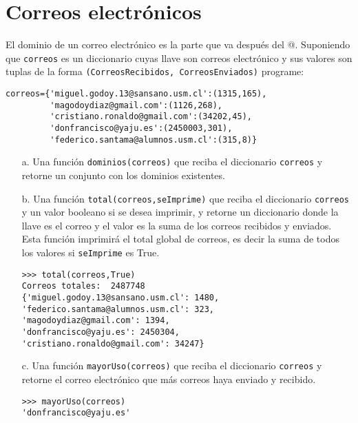 \section{Correos electrónicos}

El dominio de un correo electrónico es la parte que va después del @. Suponiendo que \texttt{correos} es un diccionario cuyas llave son correos electrónico y sus valores son tuplas de la forma \texttt{(CorreosRecibidos, CorreosEnviados)} programe:

\begin{lstlisting}[style=consola]
correos={'miguel.godoy.13@sansano.usm.cl':(1315,165),
         'magodoydiaz@gmail.com':(1126,268),
         'cristiano.ronaldo@gmail.com':(34202,45),
         'donfrancisco@yaju.es':(2450003,301),
         'federico.santama@alumnos.usm.cl':(315,8)}
\end{lstlisting}

\begin{itemize}
    \item[a.] Una función \texttt{dominios(correos)} que reciba el diccionario \texttt{correos} y retorne un conjunto con los dominios existentes.
    
    \item[b.] Una función \texttt{total(correos,seImprime)} que reciba el diccionario \texttt{correos} y un valor booleano si se desea imprimir, y retorne un diccionario donde la llave es el correo y el valor es la suma de los correos recibidos y enviados. Esta función imprimirá el total global de correos, es decir la suma de todos los valores si \texttt{seImprime} es True.
    \begin{lstlisting}[style=consola]
>>> total(correos,True)
Correos totales:  2487748
{'miguel.godoy.13@sansano.usm.cl': 1480,
'federico.santama@alumnos.usm.cl': 323,
'magodoydiaz@gmail.com': 1394,
'donfrancisco@yaju.es': 2450304,
'cristiano.ronaldo@gmail.com': 34247}
    \end{lstlisting}
    
    \item[c.] Una función \texttt{mayorUso(correos)} que reciba el diccionario \texttt{correos} y retorne el correo electrónico que más correos haya enviado y recibido.
    
    \begin{lstlisting}[style=consola]
>>> mayorUso(correos)
'donfrancisco@yaju.es'
    \end{lstlisting}
\end{itemize}